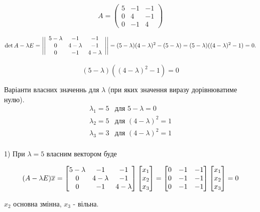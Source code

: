 {}

$$
A = \begin{pmatrix}
  5 & -1 & -1 \\
  0 & 4 & -1 \\
  0 & -1 & 4
  \end{pmatrix}
$$

$$
\det{A-\lambda E} = \Bigg|\Bigg|\begin{array}{c c c}
  5-\lambda & -1 & -1 \\
  0 & 4-\lambda & -1 \\
  0 & -1 & 4-\lambda
\end{array}\Bigg|\Bigg| = (5-\lambda) (4-\lambda)^2 - (5-\lambda) = (5-\lambda)( (4-\lambda)^2 - 1) = 0.
$$

$$
(5-\lambda)( (4-\lambda)^2 - 1) = 0
$$

Варіанти власних значеннь для $\lambda$ (при яких значення виразу дорівнюватиме нулю).
$$
\begin{array}{ll}
  \lambda_1 = 5 & {\text{для }}  5-\lambda = 0   \\
  \lambda_2 = 5 & {\text{для }}  (4-\lambda)^2=1 \\
  \lambda_3 = 3 & {\text{для }}  (4-\lambda)^2=1 \\
\end{array}
$$


1) При $\lambda = 5$ власним вектором буде

$$
(A-\lambda E)\overline{x} =
\begin{bmatrix}
  5-\lambda & -1 & -1 \\
  0 & 4-\lambda & -1 \\
  0 & -1 & 4-\lambda
\end{bmatrix}
\begin{bmatrix} x_1 \\ x_2 \\ x_3 \end{bmatrix}
=
\begin{bmatrix}
  0 & -1 & -1 \\
  0 & -1 & -1 \\
  0 & -1 & -1
\end{bmatrix}
\begin{bmatrix} x_1 \\ x_2 \\ x_3 \end{bmatrix} = 0
$$

$x_2$ основна змінна, $x_3$ - вільна.


